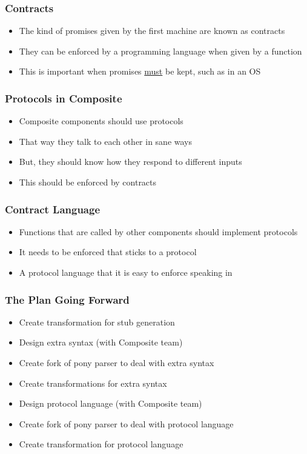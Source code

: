 \documentclass[bigger]{beamer}
\begin{document}
\begin{frame}
\frametitle{Contracts}
\label{sec-9}

\begin{itemize}
\item The kind of promises given by the first machine are known as contracts
\item They can be enforced by a programming language when given by a function
\item This is important when promises \underline{must} be kept, such as in an OS
\end{itemize}
\end{frame}
\begin{frame}
\frametitle{Protocols in Composite}
\label{sec-10}

\begin{itemize}
\item Composite components should use protocols
\item That way they talk to each other in sane ways
\item But, they should know how they respond to different inputs
\item This should be enforced by contracts
\end{itemize}
\end{frame}
\begin{frame}
\frametitle{Contract Language}
\label{sec-11}

\begin{itemize}
\item Functions that are called by other components should implement protocols
\item It needs to be enforced that sticks to a protocol
\item A protocol language that it is easy to enforce speaking in
\end{itemize}
\end{frame}
\begin{frame}
\frametitle{The Plan Going Forward}
\label{sec-12}

\begin{itemize}
\item Create transformation for stub generation
\item Design extra syntax (with Composite team)
\item Create fork of pony parser to deal with extra syntax
\item Create transformations for extra syntax
\item Design protocol language (with Composite team)
\item Create fork of pony parser to deal with protocol language
\item Create transformation for protocol language
\end{itemize}
\end{frame}
\end{document}
